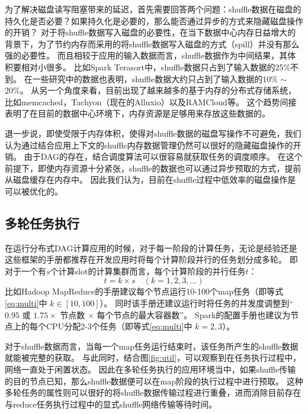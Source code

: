 为了解决磁盘读写阻塞带来的延迟，首先需要回答两个问题：shuffle数据在磁盘的持久化是否必要？如果持久化是必要的，那么能否通过异步的方式来隐藏磁盘操作的开销？
对于将shuffle数据写入磁盘的必要性，在当下数据中心内存日益增大的背景下，为了节约内存而采用的将shuffle数据写入磁盘的方式（spill）并没有那么强的必要性。
而且相较于应用的输入数据而言，shuffle数据作为中间结果，其体积要相对小很多。
比如Spark Terasort\cite{spark-tera}中，shuffle数据只占到了输入数据的25\%不到。
在一些研究中\cite{makingsense}的数据也表明，shuffle数据大约只占到了输入数据的10\% $\sim$ 20\%。
从另一个角度来看，目前出现了越来越多的基于内存的分布式存储系统，比如memcached\cite{memcached}，Tachyon\cite{tachyon}（现在的Alluxio\cite{alluxio}）以及RAMCloud\cite{ramcloud}等。
这个趋势间接表明了在目前的数据中心环境下，内存资源是足够用来存放这些数据的。

退一步说，即使受限于内存体积，使得对shuffle数据的磁盘写操作不可避免，我们认为通过结合应用上下文的shuffle内存数据管理仍然可以很好的隐藏磁盘操作的开销。
由于DAG的存在，结合调度算法可以很容易就获取任务的调度顺序。
在这个前提下，即使内存资源十分紧张，shuffle的数据也可以通过异步预取的方式，提前从磁盘缓存在内存中。
因此我们认为，目前在shuffle过程中低效率的磁盘操作是可以被优化的。

\subsection{多轮任务执行}

在运行分布式DAG计算应用的时候，对于每一阶段的计算任务，无论是经验还是这些框架的手册都推荐在开发应用时将每个计算阶段并行的任务划分成多轮。
即对于一个有$s$个计算slot的计算集群而言，每个计算阶段的并行任务$t$：
\begin{equation}
	\label{eq:multi}
	t = k \times s \quad (k = 1, 2, 3, ...)
\end{equation}
比如Hadoop MapReduce的手册\cite{hadooptutorial}建议每个节点运行10-100个map任务（即等式\ref{eq:multi}中 $k \in [10, 100]$）。
同时该手册还建议运行时将任务的并发度调整到“$0.95$ 或 $1.75 \times$ 节点数 $\times$ 每个节点的最大容器数”。
Spark的配置手册\cite{sparkconf}也建议为节点上的每个CPU分配2-3个任务（即等式\ref{eq:multi}中 $k = 2, 3$）。

对于shuffle数据而言，当每一个map任务运行结束时，该任务所产生的shuffle数据就能被完整的获取。
与此同时，结合图\ref{fig:util}，可以观察到在任务执行过程中，网络一直处于闲置状态。
因此在多轮任务执行的应用环境当中，如果shuffle传输的目的节点已知，那么shuffle数据便可以在map阶段的执行过程中进行预取。
这种多轮任务的属性则可以很好的将shuffle数据传输过程进行重叠，进而消除目前存在与reduce任务执行过程中的显式shuffle网络传输等待时间。

